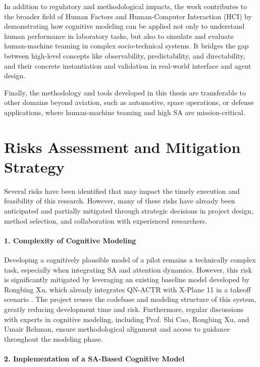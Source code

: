 \documentclass[12pt,a4paper]{article} %
\begin{document}
	In addition to regulatory and methodological impacts, the work contributes to the broader field of Human Factors and Human-Computer Interaction (HCI) by demonstrating how cognitive modeling can be applied not only to understand human performance in laboratory tasks, but also to simulate and evaluate human-machine teaming in complex socio-technical systems. It bridges the gap between high-level concepts like observability, predictability, and directability, and their concrete instantiation and validation in real-world interface and agent design.
	
	Finally, the methodology and tools developed in this thesis are transferable to other domains beyond aviation, such as automotive, space operations, or defense applications, where human-machine teaming and high SA are mission-critical.	
	
	\section{Risks Assessment and Mitigation Strategy}

	Several risks have been identified that may impact the timely execution and feasibility of this research. However, many of these risks have already been anticipated and partially mitigated through strategic decisions in project design, method selection, and collaboration with experienced researchers.

	\paragraph{1. Complexity of Cognitive Modeling}
	Developing a cognitively plausible model of a pilot remains a technically complex task, especially when integrating SA and attention dynamics. However, this risk is significantly mitigated by leveraging an existing baseline model developed by Rongbing Xu, which already integrates QN-ACTR with X-Plane 11 in a takeoff scenario \parencite{xu_modeling_2021}. The project reuses the codebase and modeling structure of this system, greatly reducing development time and risk. Furthermore, regular discussions with experts in cognitive modeling, including Prof. Shi Cao, Rongbing Xu, and Umair Rehman, ensure methodological alignment and access to guidance throughout the modeling phase.

	\paragraph{2. Implementation of a SA-Based Cognitive Model}
\end{document}

